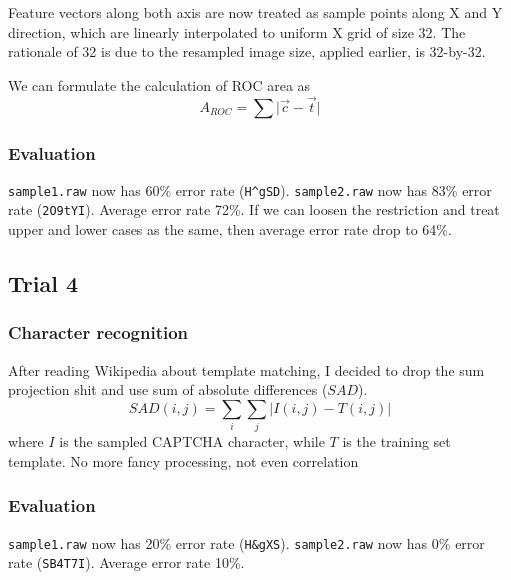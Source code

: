 \documentclass[12pt]{article}
\begin{document}
Feature vectors along both axis are now treated as sample points along X and Y direction, which are linearly interpolated to uniform X grid of size 32. The rationale of 32 is due to the resampled image size, applied earlier, is 32-by-32.

We can formulate the calculation of ROC area as 
\begin{equation}
	A_{ROC} = \sum \vert \vec{c} - \vec{t} \vert
\end{equation}

\subsubsection*{Evaluation}
{\tt sample1.raw} now has 60\% error rate ({\tt H\^{}gSD}). {\tt sample2.raw} now has 83\% error rate ({\tt 2O9tYI}). Average error rate 72\%. If we can loosen the restriction and treat upper and lower cases as the same, then average error rate drop to 64\%.

\subsection*{Trial 4}
\subsubsection*{Character recognition}
After reading Wikipedia about template matching, I decided to drop the sum projection shit and use sum of absolute differences ($SAD$). 
\begin{equation}
	SAD(i, j) = \sum_i \sum_j \vert I(i, j) - T(i, j) \vert
\end{equation}
where $I$ is the sampled CAPTCHA character, while $T$ is the training set template. No more fancy processing, not even correlation

\subsubsection*{Evaluation}
{\tt sample1.raw} now has 20\% error rate ({\tt H\&gXS}). {\tt sample2.raw} now has 0\% error rate ({\tt SB4T7I}). Average error rate 10\%. 
\end{document}
